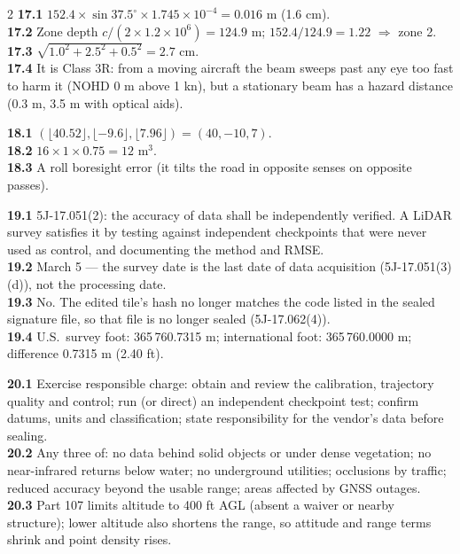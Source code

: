 \begin{multicols}{2}
\textbf{17.1} $152.4\times\sin37.5^\circ\times1.745\times10^{-4}=0.016$ m (1.6 cm).\\
\textbf{17.2} Zone depth $c/(2\times1.2\times10^6)=124.9$ m; $152.4/124.9=1.22$ $\Rightarrow$ zone 2.\\
\textbf{17.3} $\sqrt{1.0^2+2.5^2+0.5^2}=2.7$ cm.\\
\textbf{17.4} It is Class 3R: from a moving aircraft the beam sweeps past any eye too fast to harm it (NOHD 0 m above 1 kn), but a stationary beam has a hazard distance (0.3 m, 3.5 m with optical aids).

\textbf{18.1} $(\lfloor40.52\rfloor,\lfloor-9.6\rfloor,\lfloor7.96\rfloor)=(40,-10,7)$.\\
\textbf{18.2} $16\times1\times0.75=12$ m$^3$.\\
\textbf{18.3} A roll boresight error (it tilts the road in opposite senses on opposite passes).

\textbf{19.1} 5J-17.051(2): the accuracy of data shall be independently verified. A LiDAR survey satisfies it by testing against independent checkpoints that were never used as control, and documenting the method and RMSE.\\
\textbf{19.2} March 5 --- the survey date is the last date of data acquisition (5J-17.051(3)(d)), not the processing date.\\
\textbf{19.3} No. The edited tile's hash no longer matches the code listed in the sealed signature file, so that file is no longer sealed (5J-17.062(4)).\\
\textbf{19.4} U.S.\ survey foot: 365\,760.7315 m; international foot: 365\,760.0000 m; difference 0.7315 m (2.40 ft).

\textbf{20.1} Exercise responsible charge: obtain and review the calibration, trajectory quality and control; run (or direct) an independent checkpoint test; confirm datums, units and classification; state responsibility for the vendor's data before sealing.\\
\textbf{20.2} Any three of: no data behind solid objects or under dense vegetation; no near-infrared returns below water; no underground utilities; occlusions by traffic; reduced accuracy beyond the usable range; areas affected by GNSS outages.\\
\textbf{20.3} Part 107 limits altitude to 400 ft AGL (absent a waiver or nearby structure); lower altitude also shortens the range, so attitude and range terms shrink and point density rises.
\end{multicols}
\normalsize

